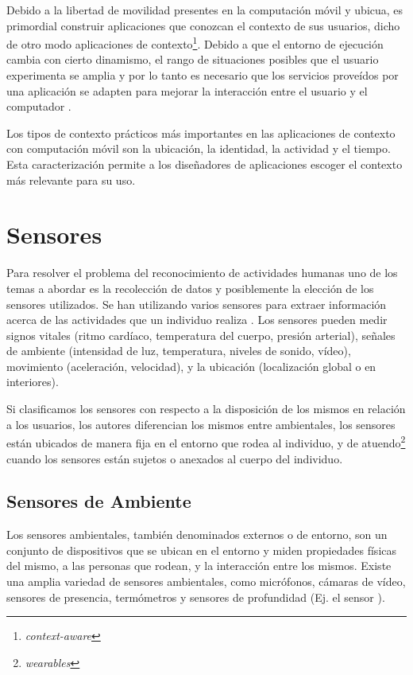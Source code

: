 Debido a la libertad de movilidad presentes en la computación móvil
y ubicua, es primordial construir aplicaciones que conozcan el contexto
de sus usuarios, dicho de otro modo aplicaciones de contexto\footnote{\emph{context-aware}}.
Debido a que el entorno de ejecución cambia con cierto dinamismo,
el rango de situaciones posibles que el usuario experimenta se amplia
y por lo tanto es necesario que los servicios proveídos por una aplicación
se adapten para mejorar la interacción entre el usuario y el computador
\cite{Dey2000}.

Los tipos de contexto prácticos más importantes en las aplicaciones
de contexto con computación móvil son la ubicación, la identidad,
la actividad y el tiempo. Esta caracterización permite a los diseñadores
de aplicaciones escoger el contexto más relevante para su uso.

\section{Sensores}

\label{sec23:sensores} Para resolver el problema del reconocimiento
de actividades humanas uno de los temas a abordar es la recolección
de datos y posiblemente la elección de los sensores utilizados. Se
han utilizando varios sensores para extraer información acerca de
las actividades que un individuo realiza \cite{Chen2012,LaraLabrador2012}.
Los sensores pueden medir signos vitales (ritmo cardíaco, temperatura
del cuerpo, presión arterial), señales de ambiente (intensidad de
luz, temperatura, niveles de sonido, vídeo), movimiento (aceleración,
velocidad), y la ubicación (localización global o en interiores). 

Si clasificamos los sensores con respecto a la disposición de los
mismos en relación a los usuarios, los autores \cite{ReyesOrtiz2015,LaraLabrador2013}
diferencian los mismos entre ambientales, los sensores están ubicados
de manera fija en el entorno que rodea al individuo, y de atuendo\footnote{\emph{wearables}}
cuando los sensores están sujetos o anexados al cuerpo del individuo.

\subsection{Sensores de Ambiente}

Los sensores ambientales, también denominados externos o de entorno,
son un conjunto de dispositivos que se ubican en el entorno y miden
propiedades físicas del mismo, a las personas que rodean, y la interacción
entre los mismos. Existe una amplia variedad de sensores ambientales,
como micrófonos, cámaras de vídeo, sensores de presencia, termómetros
y sensores de profundidad (Ej. el sensor ). 

